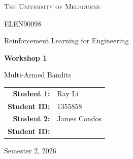 \documentclass[11pt,a4paper]{article}  %
\newcommand{\studentonename}{Ray Li}
\newcommand{\studentoneid}{1355858}
\newcommand{\studenttwoname}{James Condos}
\newcommand{\studenttwoid}{}
\begin{document}

\hypersetup{pageanchor=false}
\begin{titlepage}
\thispagestyle{empty}
\centering

\vspace*{2.5cm}

{\Large\textsc{The University of Melbourne}\par}

\vspace{1.5cm}

{\Large ELEN90098\par}

\vspace{0.3cm}

{\Large Reinforcement Learning for Engineering\par}

\vspace{2.5cm}

{\Huge\bfseries Workshop 1\par}

\vspace{0.4cm}

{\LARGE Multi-Armed Bandits\par}

\vfill

\begin{tabular}{rl}
    \textbf{Student 1:}     & \studentonename \\[0.15cm]
    \textbf{Student ID:}   & \studentoneid \\[0.6cm]

    \textbf{Student 2:}     & \studenttwoname \\[0.15cm]
    \textbf{Student ID:}   & \studenttwoid
\end{tabular}

\vfill

{\large Semester 2, 2026\par}

\vspace{1.5cm}

\end{titlepage}
\hypersetup{pageanchor=true}


\pagestyle{fancy}
\setcounter{page}{1}
\end{document}
